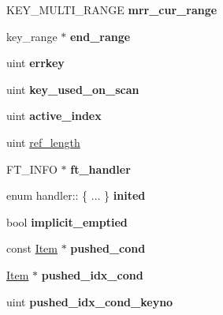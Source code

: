 \begin{DoxyCompactItemize}
\item 
\mbox{\label{classhandler_af2347edc229832e533d1fb73b236e32b}} 
K\+E\+Y\+\_\+\+M\+U\+L\+T\+I\+\_\+\+R\+A\+N\+GE {\bfseries mrr\+\_\+cur\+\_\+range}
\item 
\mbox{\label{classhandler_a28d698fe9901f0f487c9618ddbb0f1be}} 
key\+\_\+range $\ast$ {\bfseries end\+\_\+range}
\item 
\mbox{\label{classhandler_a3186b7c7a70634a8e9758ed51708359c}} 
uint {\bfseries errkey}
\item 
\mbox{\label{classhandler_a5ad5efc62f32ef66b55667fd8370ef33}} 
uint {\bfseries key\+\_\+used\+\_\+on\+\_\+scan}
\item 
\mbox{\label{classhandler_a29f2838eebffef46663c19f85d2ad2cc}} 
uint {\bfseries active\+\_\+index}
\item 
uint \mbox{\hyperlink{classhandler_a64def328ff0ca7e391b217c2d3a758ec}{ref\+\_\+length}}
\item 
\mbox{\label{classhandler_a943005f89e7a6d5cee246e1c5b46e9ab}} 
F\+T\+\_\+\+I\+N\+FO $\ast$ {\bfseries ft\+\_\+handler}
\item 
\mbox{\label{classhandler_ae346e9156bcf1dd515eef535c40ca601}} 
enum handler\+:: \{ ... \}  {\bfseries inited}
\item 
\mbox{\label{classhandler_afd47d68a7b406d8777396a657095d5e8}} 
bool {\bfseries implicit\+\_\+emptied}
\item 
\mbox{\label{classhandler_a0ed2f8d7155cb44162bb4181cb09f2f3}} 
const \mbox{\hyperlink{classItem}{Item}} $\ast$ {\bfseries pushed\+\_\+cond}
\item 
\mbox{\label{classhandler_ae9b3d956f73649657bad389acfad5f0b}} 
\mbox{\hyperlink{classItem}{Item}} $\ast$ {\bfseries pushed\+\_\+idx\+\_\+cond}
\item 
\mbox{\label{classhandler_a4dc8d81143d1c9c10b976711fe44cf37}} 
uint {\bfseries pushed\+\_\+idx\+\_\+cond\+\_\+keyno}
\item 

\end{DoxyCompactItemize}
